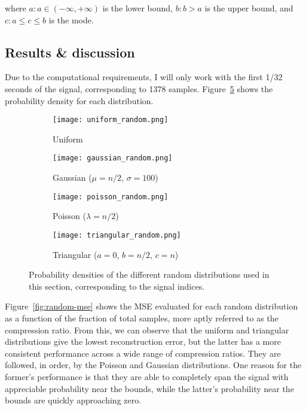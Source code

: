 \noindent where $a: a \in (-\infty, +\infty)$ is the lower bound, $b: b > a$ is the upper bound, and $c: a \leq c \leq b$ is the mode.

\subsection{Results \& discussion}
\label{ssec:random-distro-rnd}
Due to the computational requirements, I will only work with the first 1/32 seconds of the signal, corresponding to 1378 samples. Figure~\ref{fig:random-pdf} shows the probability density for each distribution.

\begin{figure}[htb]
	\centering
	\begin{subfigure}[h!]{0.49\textwidth}
		\centering
		\texttt{[image: uniform\_random.png]}
		\caption{Uniform}
		\label{fig:random-pdf-uniform}
	\end{subfigure}
	\begin{subfigure}[h!]{0.49\textwidth}
		\centering
		\texttt{[image: gaussian\_random.png]}
		\caption{Gaussian ($\mu = n/2$, $\sigma = 100$)}
		\label{fig:random-pdf-gaussian}
	\end{subfigure}
	\begin{subfigure}[h!]{0.49\textwidth}
		\centering
		\texttt{[image: poisson\_random.png]}
		\caption{Poisson ($\lambda = n/2$)}
		\label{fig:random-pdf-poisson}
	\end{subfigure}
	\begin{subfigure}[h!]{0.49\textwidth}
		\centering
		\texttt{[image: triangular\_random.png]}
		\caption{Triangular ($a = 0$, $b = n/2$, $c = n$)}
		\label{fig:random-pdf-triangular}
	\end{subfigure}
	\caption{Probability densities of the different random distributions used in this section, corresponding to the signal indices.}
	\label{fig:random-pdf}
\end{figure}

Figure~\ref{fig:random-mse} shows the MSE evaluated for each random distribution as a function of the fraction of total samples, more aptly referred to as the compression ratio. From this, we can observe that the uniform and triangular distributions give the lowest reconstruction error, but the latter has a more consistent performance across a wide range of compression ratios. They are followed, in order, by the Poisson and Gaussian distributions. One reason for the former's performance is that they are able to completely span the signal with appreciable probability near the bounds, while the latter's probability near the bounds are quickly approaching zero.

